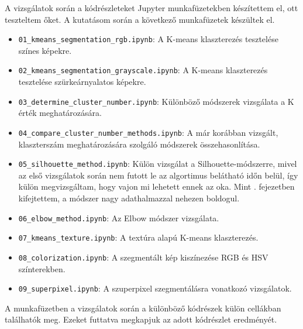 
A vizsgálatok során a kódrészleteket Jupyter munkafüzetekben készítettem el, ott teszteltem őket. A kutatásom során a következő munkafüzetek készültek el.
\begin{itemize}
\item \texttt{01\_kmeans\_segmentation\_rgb.ipynb}: A K-means klaszterezés tesztelése színes képekre.
\item \texttt{02\_kmeans\_segmentation\_grayscale.ipynb}: A K-means klaszterezés tesztelése szürkeárnyalatos képekre.
\item \texttt{03\_determine\_cluster\_number.ipynb}: Különböző módszerek vizsgálata a K érték meghatározására.
\item \texttt{04\_compare\_cluster\_number\_methods.ipynb}: A már korábban vizsgált, klaszterszám meghatározására szolgáló módszerek összehasonlítása.
\item \texttt{05\_silhouette\_method.ipynb}: Külön vizsgálat a Silhouette-módszerre, mivel az első vizsgálatok során nem futott le az algortimus belátható időn belül, így külön megvizsgáltam, hogy vajon mi lehetett ennek az oka. Mint . fejezetben kifejtettem, a módszer nagy adathalmazzal nehezen boldogul.
\item \texttt{06\_elbow\_method.ipynb}: Az Elbow módszer vizsgálata.
\item \texttt{07\_kmeans\_texture.ipynb}: A textúra alapú K-means klaszterezés.
\item \texttt{08\_colorization.ipynb}: A szegmentált kép kiszínezése RGB és HSV színterekben.
\item \texttt{09\_superpixel.ipynb}: A szuperpixel szegmentálásra vonatkozó vizsgálatok. 
\end{itemize}

A munkafüzetben a vizsgálatok során a különböző kódrészek külön cellákban találhatók meg. Ezeket futtatva megkapjuk az adott kódrészlet eredményét. 